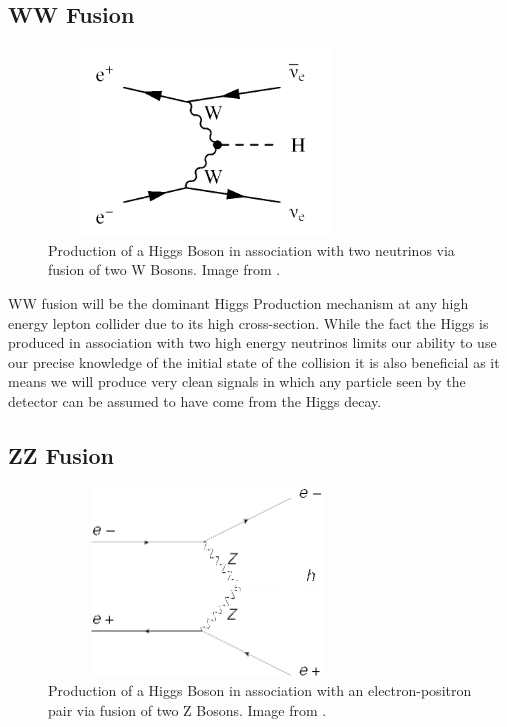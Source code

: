 \subsection{WW Fusion}
\begin{figure}[h]
  \centering
  \includegraphics[width=0.75\textwidth,height=5cm,keepaspectratio]{fig/WWFusion}
  \caption[WW Fusion]{Production of a Higgs Boson in association with two neutrinos via fusion of two W Bosons. Image from \cite{Simon:2014aqa}.}
    \label{Fig:WWFusion}
\end{figure}

WW fusion will be the dominant Higgs Production mechanism at any high energy lepton collider due to its high cross-section. While the fact the Higgs is produced in association with two high energy neutrinos limits our ability to use our precise knowledge of the initial state of the collision it is also beneficial as it means we will produce very clean signals in which any particle seen by the detector can be assumed to have come from the Higgs decay.
\subsection{ZZ Fusion}
\begin{figure}[h]
  \centering
  \includegraphics[width=0.75\textwidth,height=5cm,keepaspectratio]{fig/ZZFusion}
  \caption[ZZ Fusion]{Production of a Higgs Boson in association with an electron-positron pair via fusion of two Z Bosons. Image from \cite{Han:2015ofa}.}
  \label{Fig:ZZFusion}
\end{figure}

